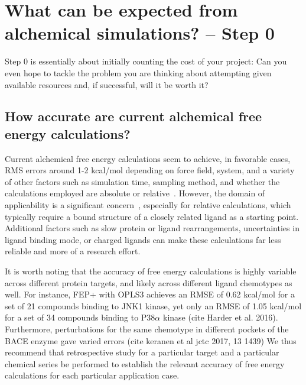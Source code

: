 \documentclass[9pt,bestpractices]{livecoms}
\begin{document}
\section{What can be expected from alchemical simulations? -- Step 0}
\label{sec:step0}
Step 0 is essentially about initially counting the cost of your
project: Can you even hope to tackle the problem you are thinking
about attempting given available resources and, if successful, will it
be worth it?
\subsection*{How accurate are current alchemical free energy calculations?}
Current alchemical free energy calculations seem to achieve, in favorable cases, RMS errors around 1-2 kcal/mol depending on force field, system, and a variety of other factors such as simulation time, sampling method, and whether the calculations employed are absolute or relative~\cite{lots-of-citations}. 
However, the domain of applicability is a significant concern~\cite{Sherborne2016, Cournia2017}, especially for relative calculations, which typically require a bound structure of a closely
related ligand as a starting point. Additional factors such as slow protein or ligand rearrangements, uncertainties in ligand binding mode, or charged ligands can make these calculations far less reliable and more of a research effort.

It is worth noting that the accuracy of free energy calculations is highly variable across different protein targets, and likely across different ligand chemotypes as well. For instance, FEP+ with OPLS3 achieves an RMSE of 0.62 kcal/mol for a set of 21 compounds binding to JNK1 kinase, yet only an RMSE of 1.05 kcal/mol for a set of 34 compounds binding to P38$\alpha$ kinase (cite Harder et al. 2016). Furthermore, perturbations for the same chemotype in different pockets of the BACE enzyme gave varied errors (cite keranen et al jctc 2017, 13 1439)  
We
thus recommend that retrospective study for a particular target and a particular chemical series be performed to establish the relevant accuracy of free energy calculations for each particular application case.
\end{document}
